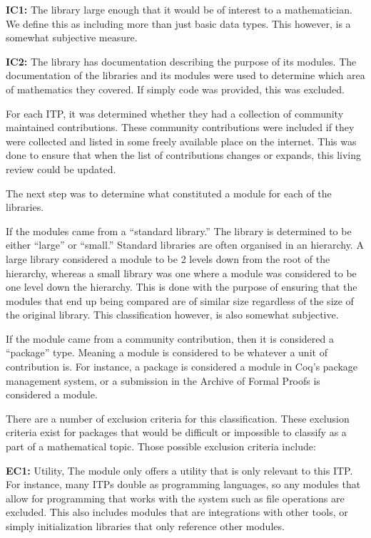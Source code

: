 \documentclass[
]{article}
\begin{document}
\textbf{IC1:} The library large enough that it would be of interest to a
mathematician. We define this as including more than just basic data
types. This however, is a somewhat subjective measure.

\textbf{IC2:} The library has documentation describing the purpose of
its modules. The documentation of the libraries and its modules were
used to determine which area of mathematics they covered. If simply code
was provided, this was excluded.

For each ITP, it was determined whether they had a collection of
community maintained contributions. These community contributions were
included if they were collected and listed in some freely available
place on the internet. This was done to ensure that when the list of
contributions changes or expands, this living review could be updated.

The next step was to determine what constituted a module for each of the
libraries.

If the modules came from a ``standard library.'' The library is
determined to be either ``large'' or ``small.'' Standard libraries are
often organised in an hierarchy. A large library considered a module to
be 2 levels down from the root of the hierarchy, whereas a small library
was one where a module was considered to be one level down the
hierarchy. This is done with the purpose of ensuring that the modules
that end up being compared are of similar size regardless of the size of
the original library. This classification however, is also somewhat
subjective.

If the module came from a community contribution, then it is considered
a ``package'' type. Meaning a module is considered to be whatever a unit
of contribution is. For instance, a package is considered a module in
Coq's package management system, or a submission in the Archive of
Formal Proofs is considered a module.

There are a number of exclusion criteria for this classification. These
exclusion criteria exist for packages that would be difficult or
impossible to classify as a part of a mathematical topic. Those possible
exclusion criteria include:

\textbf{EC1:} Utility, The module only offers a utility that is only
relevant to this ITP. For instance, many ITPs double as programming
languages, so any modules that allow for programming that works with the
system such as file operations are excluded. This also includes modules
that are integrations with other tools, or simply initialization
libraries that only reference other modules.
\end{document}

